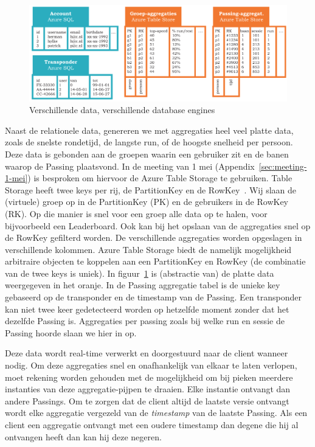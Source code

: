 \begin{figure}
\centering
\includegraphics[width=\textwidth]{style/images/DBEngines}
\caption{Verschillende data, verschillende database engines}
\label{fig:dbengines}
\end{figure}

Naast de relationele data, genereren we met aggregaties heel veel platte data, zoals de snelste rondetijd, de langste run, of de hoogste snelheid per persoon. Deze data is gebonden aan de groepen waarin een gebruiker zit en de banen waarop de Passing plaatsvond. In de meeting van 1 mei (Appendix~\ref{sec:meeting-1-mei}) is besproken om hiervoor de Azure Table Storage te gebruiken. Table Storage heeft twee keys per rij, de PartitionKey en de RowKey~\cite{azuretablestorage}. Wij slaan de (virtuele) groep op in de PartitionKey (PK) en de gebruikers in de RowKey (RK). Op die manier is snel voor een groep alle data op te halen, voor bijvoorbeeld een Leaderboard. Ook kan bij het opslaan van de aggregaties snel op de RowKey gefilterd worden. De verschillende aggregaties worden opgeslagen in verschillende kolommen. Azure Table Storage biedt de namelijk mogelijkheid arbitraire objecten te koppelen aan een PartitionKey en RowKey (de combinatie van de twee keys is uniek). In figuur~\ref{fig:dbengines} is (abstractie van) de platte data weergegeven in het oranje. In de Passing aggregatie tabel is de unieke key gebaseerd op de transponder en de timestamp van de Passing. Een transponder kan niet twee keer gedetecteerd worden op hetzelfde moment zonder dat het dezelfde Passing is. Aggregaties per passing zoals bij welke run en sessie de Passing hoorde slaan we hier in op.

Deze data wordt real-time verwerkt en doorgestuurd naar de client wanneer nodig. Om deze aggregaties snel en onafhankelijk van elkaar te laten verlopen, moet rekening worden gehouden met de mogelijkheid om bij pieken meerdere instanties van deze aggregatie-pijpen te draaien. Elke instantie ontvangt dan andere Passings. Om te zorgen dat de client altijd de laatste versie ontvangt wordt elke aggregatie vergezeld van de \textit{timestamp} van de laatste Passing. Als een client een aggregatie ontvangt met een oudere timestamp dan degene die hij al ontvangen heeft dan kan hij deze negeren.

